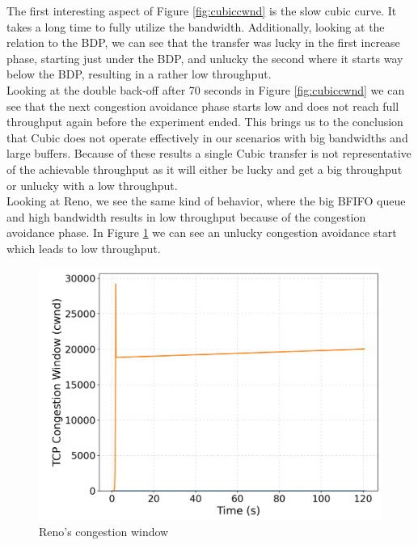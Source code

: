 \documentclass[a4paper,english, 11pt]{report}
\begin{document}
The first interesting aspect of Figure \ref{fig:cubiccwnd} is the slow cubic curve. It takes a long time to fully utilize the bandwidth. Additionally, looking at the relation to the BDP, we can see that the transfer was lucky in the first increase phase, starting just under the BDP, and unlucky the second where it starts way below the BDP, resulting in a rather low throughput.\\

Looking at the double back-off after 70 seconds in Figure \ref{fig:cubiccwnd} we can see that the next congestion avoidance phase starts low and does not reach full throughput again before the experiment ended. This brings us to the conclusion that Cubic does not operate effectively in our scenarios with big bandwidths and large buffers. Because of these results a single Cubic transfer is not representative of the achievable throughput as it will either be lucky and get a big throughput or unlucky with a low throughput.\\

Looking at Reno, we see the same kind of behavior, where the big BFIFO queue and high bandwidth results in low throughput because of the congestion avoidance phase. In Figure \ref{fig:renocwnd} we can see an unlucky congestion avoidance start which leads to low throughput.
 
\begin{figure}[!h!] %
	\centering
	\includegraphics[scale=0.25]{../diagrams/witestlab/renocwnd.png}
  	\caption{Reno's congestion window}
  	\label{fig:renocwnd}
\end{figure}
\end{document}
